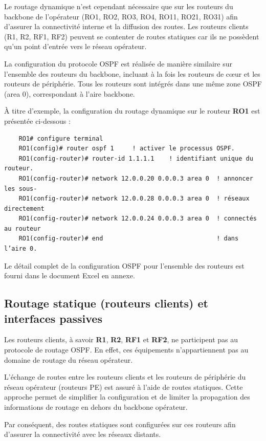 \documentclass[12pt,a4paper, oneside]{memoir}
\begin{document}
Le routage dynamique n’est cependant nécessaire que sur les routeurs du backbone de l’opérateur (RO1, RO2, RO3, RO4, RO11, RO21, RO31) afin d’assurer la connectivité interne et la diffusion des routes. Les routeurs clients (R1, R2, RF1, RF2) peuvent se contenter de routes statiques car ils ne possèdent qu’un point d’entrée vers le réseau opérateur.

La configuration du protocole OSPF est réalisée de manière similaire sur l’ensemble des routeurs du backbone, incluant à la fois les routeurs de cœur et les routeurs de périphérie. Tous les routeurs sont intégrés dans une même zone OSPF (area 0), correspondant à l’aire backbone.

À titre d’exemple, la configuration du routage dynamique sur le routeur \textbf{RO1} est présentée ci-dessous :

\begin{verbatim}
	RO1# configure terminal
	RO1(config)# router ospf 1     ! activer le processus OSPF.
	RO1(config-router)# router-id 1.1.1.1    ! identifiant unique du routeur.
	RO1(config-router)# network 12.0.0.20 0.0.0.3 area 0  ! annoncer les sous-
	RO1(config-router)# network 12.0.0.28 0.0.0.3 area 0  ! réseaux directement 
	RO1(config-router)# network 12.0.0.24 0.0.0.3 area 0  ! connectés au routeur
	RO1(config-router)# end                               ! dans l’aire 0.
\end{verbatim}

Le détail complet de la configuration OSPF pour l’ensemble des routeurs est fourni dans le document Excel en annexe.


\subsection{Routage statique (routeurs clients) et interfaces passives}

Les routeurs clients, à savoir \textbf{R1}, \textbf{R2}, \textbf{RF1} et \textbf{RF2}, ne participent pas au protocole de routage OSPF. En effet, ces équipements n’appartiennent pas au domaine de routage du réseau opérateur.

L’échange de routes entre les routeurs clients et les routeurs de périphérie du réseau opérateur (routeurs PE) est assuré à l’aide de routes statiques. Cette approche permet de simplifier la configuration et de limiter la propagation des informations de routage en dehors du backbone opérateur.

Par conséquent, des routes statiques sont configurées sur ces routeurs afin d’assurer la connectivité avec les réseaux distants.
\end{document}
